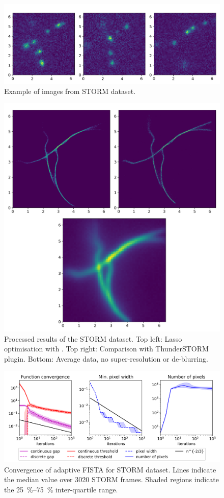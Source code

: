 \documentclass[10pt,a4paper,onecolumn]{article} \usepackage[latin1]{inputenc}
\numberwithin{equation}{section}
\begin{document}
\begin{figure}\centering
	\includegraphics[width=.8\textwidth]{STORM_data}
	\caption{Example of images from STORM dataset.}\label{fig:ca: STORM data}
\end{figure}
\begin{figure}\centering
	\includegraphics[width=.77\textwidth]{STORM_recon}
	\caption{Processed results of the STORM dataset. Top left: Lasso optimisation with . Top right: Comparison with ThunderSTORM plugin. Bottom: Average data, no super-resolution or de-blurring.}\label{fig:ca: STORM results}
\end{figure}
\begin{figure}\centering
	\includegraphics[width=\textwidth]{lasso2_convergence}
	\caption{Convergence of adaptive FISTA for STORM dataset. Lines indicate the median value over 3020 STORM frames. Shaded regions indicate the \SIrange{25}{75}{\percent} inter-quartile range.}\label{fig:ca: STORM convergence}
\end{figure}
\end{document}
